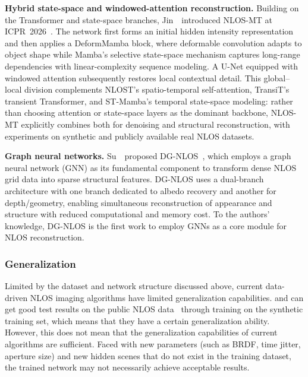 \vspace{0.8mm}

\vspace{0.8mm}
\noindent \textbf{Hybrid state-space and windowed-attention reconstruction.}
Building on the Transformer and state-space branches, Jin~\etal~introduced NLOS-MT at ICPR~2026~\cite{jinNLOSMT2026}. The network first forms an initial hidden intensity representation and then applies a DeformMamba block, where deformable convolution adapts to object shape while Mamba's selective state-space mechanism captures long-range dependencies with linear-complexity sequence modeling. A U-Net equipped with windowed attention subsequently restores local contextual detail. This global--local division complements NLOST's spatio-temporal self-attention, TransiT's transient Transformer, and ST-Mamba's temporal state-space modeling: rather than choosing attention or state-space layers as the dominant backbone, NLOS-MT explicitly combines both for denoising and structural reconstruction, with experiments on synthetic and publicly available real NLOS datasets.

\noindent \textbf{Graph neural networks.}
Su~\etal~proposed DG-NLOS~\cite{suDGNLOS2025}, which employs a graph neural network (GNN) as its fundamental component to transform dense NLOS grid data into sparse structural features. DG-NLOS uses a dual-branch architecture with one branch dedicated to albedo recovery and another for depth/geometry, enabling simultaneous reconstruction of appearance and structure with reduced computational and memory cost. To the authors' knowledge, DG-NLOS is the first work to employ GNNs as a core module for NLOS reconstruction.

\subsubsection{Generalization}
Limited by the dataset and network structure discussed above, current data-driven NLOS imaging algorithms have limited generalization capabilities. \cite{chopiteDeepNonLineofSightReconstruction2020} and \cite{chen_learned_2020} can get good test results on the public NLOS data~\cite{galindoDatasetBenchmarkingTimeresolved2019,otooleConfocalNonlineofsightImaging2018} through training on the synthetic training set, which means that they have a certain generalization ability. However, this does not mean that the generalization capabilities of current algorithms are sufficient. Faced with new parameters (such as BRDF, time jitter, aperture size) and new hidden scenes that do not exist in the training dataset, the trained network may not necessarily achieve acceptable results.

